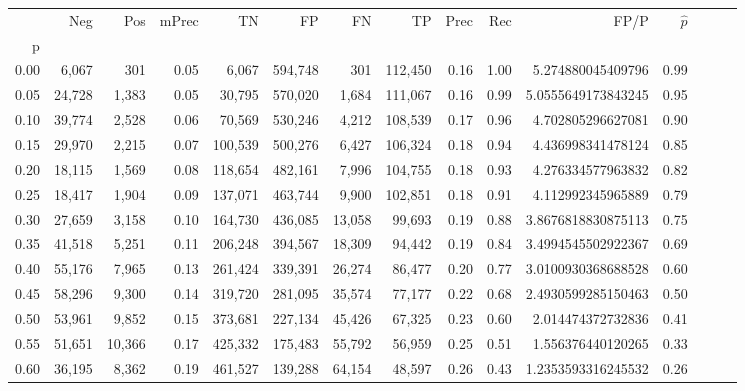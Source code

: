 \begin{tabular}{rrrrrrrrrrrrrrr}
\toprule
{} &     Neg &     Pos & mPrec &       TN &       FP &       FN &       TP &  Prec &   Rec &                 FP/P & $\hat{p}$ \\
p    &         &         &       &          &          &          &          &       &       &                      &           \\
\midrule
0.00 &   6,067 &     301 &  0.05 &    6,067 &  594,748 &      301 &  112,450 &  0.16 &  1.00 &    5.274880045409796 &      0.99 \\
0.05 &  24,728 &   1,383 &  0.05 &   30,795 &  570,020 &    1,684 &  111,067 &  0.16 &  0.99 &   5.0555649173843245 &      0.95 \\
0.10 &  39,774 &   2,528 &  0.06 &   70,569 &  530,246 &    4,212 &  108,539 &  0.17 &  0.96 &    4.702805296627081 &      0.90 \\
0.15 &  29,970 &   2,215 &  0.07 &  100,539 &  500,276 &    6,427 &  106,324 &  0.18 &  0.94 &    4.436998341478124 &      0.85 \\
0.20 &  18,115 &   1,569 &  0.08 &  118,654 &  482,161 &    7,996 &  104,755 &  0.18 &  0.93 &    4.276334577963832 &      0.82 \\
0.25 &  18,417 &   1,904 &  0.09 &  137,071 &  463,744 &    9,900 &  102,851 &  0.18 &  0.91 &    4.112992345965889 &      0.79 \\
0.30 &  27,659 &   3,158 &  0.10 &  164,730 &  436,085 &   13,058 &   99,693 &  0.19 &  0.88 &   3.8676818830875113 &      0.75 \\
0.35 &  41,518 &   5,251 &  0.11 &  206,248 &  394,567 &   18,309 &   94,442 &  0.19 &  0.84 &   3.4994545502922367 &      0.69 \\
0.40 &  55,176 &   7,965 &  0.13 &  261,424 &  339,391 &   26,274 &   86,477 &  0.20 &  0.77 &   3.0100930368688528 &      0.60 \\
0.45 &  58,296 &   9,300 &  0.14 &  319,720 &  281,095 &   35,574 &   77,177 &  0.22 &  0.68 &   2.4930599285150463 &      0.50 \\
0.50 &  53,961 &   9,852 &  0.15 &  373,681 &  227,134 &   45,426 &   67,325 &  0.23 &  0.60 &    2.014474372732836 &      0.41 \\
0.55 &  51,651 &  10,366 &  0.17 &  425,332 &  175,483 &   55,792 &   56,959 &  0.25 &  0.51 &    1.556376440120265 &      0.33 \\
0.60 &  36,195 &   8,362 &  0.19 &  461,527 &  139,288 &   64,154 &   48,597 &  0.26 &  0.43 &   1.2353593316245532 &      0.26 \\

\end{tabular}
